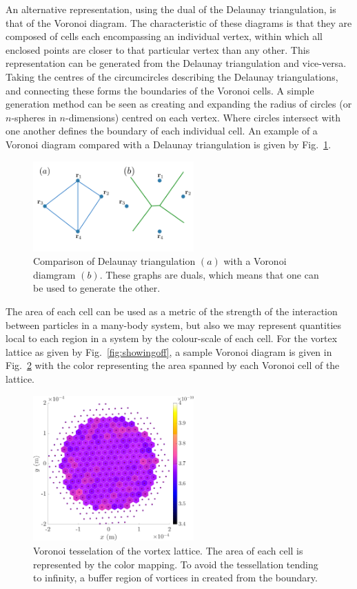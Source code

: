 An alternative representation, using the dual of the Delaunay triangulation, is that of the Voronoi diagram. The characteristic of these diagrams is that they are composed of cells each encompassing an individual vertex, within which all enclosed points are closer to that particular vertex than any other. This representation can be generated from the Delaunay triangulation and vice-versa. Taking the centres of the circumcircles describing the Delaunay triangulations, and connecting these forms the boundaries of the Voronoi cells. A simple generation method can be seen as creating and expanding the radius of circles (or $n$-spheres in $n$-dimensions) centred on each vertex. Where circles intersect with one another defines the boundary of each individual cell. An example of a Voronoi diagram compared with a Delaunay triangulation is given by Fig.~\ref{fig:Voronoi}.
\begin{figure}\centering
    \includegraphics[width=0.55\textwidth]{Images/ch6_phasegineer/imgs/Voronoi}
    \caption{Comparison of Delaunay triangulation $(a)$ with a Voronoi diamgram $(b)$. These graphs are duals, which means that one can be used to generate the other.}\label{fig:Voronoi}
\end{figure}
The area of each cell can be used as a metric of the strength of the interaction between particles in a many-body system, but also we may represent quantities local to each region in a system by the colour-scale of each cell. For the vortex lattice as given by Fig.~\ref{fig:showingoff}, a sample Voronoi diagram is given in Fig.~\ref{fig:voron_vtxlatt} with the color representing the area spanned by each Voronoi cell of the lattice.

\begin{figure}\centering
    \includegraphics[width=0.55\textwidth]{Images/ch4_vtx/Voronoi_area_VTXLATT}
    \caption{Voronoi tesselation of the vortex lattice. The area of each cell is represented by the color mapping. To avoid the tessellation tending to infinity, a buffer region of vortices in created from the boundary. }\label{fig:voron_vtxlatt}
\end{figure}
